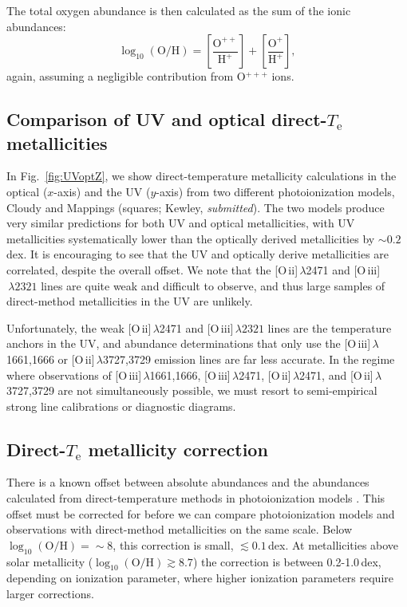 \documentclass[preprint2]{aastex62}
\newcommand{\oiii}{[O\,{\sc iii}]\xspace}
\newcommand{\oii}{[O\,{\sc ii}]\xspace}
\newcommand{\logten}{\ensuremath{\log_{10}}}
\newcommand{\logOH}{\ensuremath{\logten (\mathrm{O}/\mathrm{H})}\xspace}
\newcommand{\Te}{\ensuremath{T_{\mathrm{e}}}\xspace}
\begin{document}
The total oxygen abundance is then calculated as the sum of the ionic abundances:
\begin{equation}
    \log_{10}(\mathrm{O}/\mathrm{H}) = \left[ \frac{\mathrm{O}^{++}}{\mathrm{H}^{+}} \right] + \left[ \frac{\mathrm{O}^{+}}{\mathrm{H}^{+}} \right],
\end{equation}
again, assuming a negligible contribution from O$^{+++}$ ions.

\subsection{Comparison of UV and optical direct-\Te metallicities}

In Fig.~\ref{fig:UVoptZ}, we show direct-temperature metallicity calculations in the optical ($x$-axis) and the UV ($y$-axis) from two different photoionization models, Cloudy \citep[circles;][]{Byler+2018} and Mappings (squares; Kewley, \emph{submitted}). The two models produce very similar predictions for both UV and optical metallicities, with UV metallicities systematically lower than the optically derived metallicities by $\sim0.2$\,dex. It is encouraging to see that the UV and optically derive metallicities are correlated, despite the overall offset. We note that the \oii$\,\lambda$2471 and \oiii$\,\lambda2321$ lines are quite weak and difficult to observe, and thus large samples of direct-method metallicities in the UV are unlikely.

Unfortunately, the weak \oii$\,\lambda$2471 and \oiii$\,\lambda2321$ lines are the temperature anchors in the UV, and abundance determinations that only use the \oiii$\,\lambda$1661,1666 or \oii$\,\lambda$3727,3729 emission lines are far less accurate. In the regime where observations of  \oiii$\,\lambda$1661,1666, \oiii$\,\lambda$2471, \oii$\,\lambda$2471, and \oii$\,\lambda$3727,3729 are not simultaneously possible, we must resort to semi-empirical strong line calibrations or diagnostic diagrams.

\subsection{Direct-\Te metallicity correction}\label{sec:model:corr}

There is a known offset between absolute abundances and the abundances calculated from direct-temperature methods in photoionization models \citep{Kewley+2008}. This offset must be corrected for before we can compare photoionization models and observations with direct-method metallicities on the same scale. Below \logOH$ = {\sim}8$, this correction is small, $\lesssim 0.1$\,dex. At metallicities above solar metallicity (\logOH$\gtrsim 8.7$) the correction is between 0.2-1.0\,dex, depending on ionization parameter, where higher ionization parameters require larger corrections.
\end{document}
